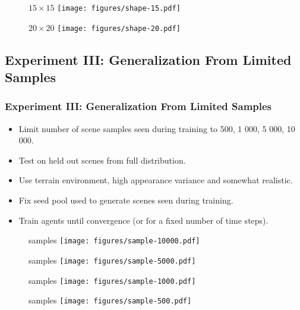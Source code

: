 \begin{frame}
    \begin{figure}
        \centering
        \(15 \times 15\)
        \texttt{[image: figures/shape-15.pdf]}
    \end{figure}
\end{frame}

\begin{frame}
    \begin{figure}
        \centering
        \(20 \times 20\)
        \texttt{[image: figures/shape-20.pdf]}
    \end{figure}
\end{frame}

\subsection{Experiment III: Generalization From Limited Samples}

\begin{frame}
    \frametitle{Experiment III: Generalization From Limited Samples}

    \begin{itemize}
        \item Limit number of scene samples seen during training to 500, 1 000, 5 000, 10 000.
        \item Test on held out scenes from full distribution. 
        \item Use terrain environment, high appearance variance and somewhat realistic.
        \item Fix seed pool used to generate scenes seen during training.
        \item Train agents until convergence (or for a fixed number of time steps).
    \end{itemize}
\end{frame}

\begin{frame}
    \begin{figure}
         samples
        \texttt{[image: figures/sample-10000.pdf]}
    \end{figure}
\end{frame}

\begin{frame}
    \begin{figure}
         samples
        \texttt{[image: figures/sample-5000.pdf]}
    \end{figure}
\end{frame}

\begin{frame}
    \begin{figure}
         samples
        \texttt{[image: figures/sample-1000.pdf]}
    \end{figure}
\end{frame}

\begin{frame}
    \begin{figure}
         samples
        \texttt{[image: figures/sample-500.pdf]}
    \end{figure}
\end{frame}